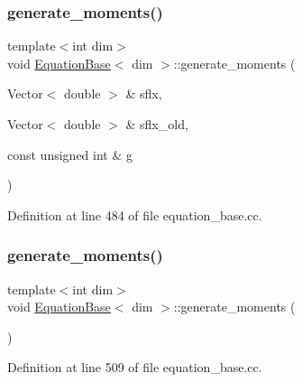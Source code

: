 \subsubsection{\texorpdfstring{generate\+\_\+moments()}{generate\_moments()}\hspace{0.1cm}{\footnotesize\ttfamily [2/3]}}
{\footnotesize\ttfamily template$<$int dim$>$ \\
void \hyperlink{class_equation_base}{Equation\+Base}$<$ dim $>$\+::generate\+\_\+moments (\begin{DoxyParamCaption}\item[{Vector$<$ double $>$ \&}]{sflx,  }\item[{Vector$<$ double $>$ \&}]{sflx\+\_\+old,  }\item[{const unsigned int \&}]{g }\end{DoxyParamCaption})\hspace{0.3cm}{\ttfamily [virtual]}}



Definition at line 484 of file equation\+\_\+base.\+cc.

\mbox{\label{class_equation_base_ab74a0a15d0d2a20022cafad8dd6f46aa}} 
\subsubsection{\texorpdfstring{generate\+\_\+moments()}{generate\_moments()}\hspace{0.1cm}{\footnotesize\ttfamily [3/3]}}
{\footnotesize\ttfamily template$<$int dim$>$ \\
void \hyperlink{class_equation_base}{Equation\+Base}$<$ dim $>$\+::generate\+\_\+moments (\begin{DoxyParamCaption}{ }\end{DoxyParamCaption})\hspace{0.3cm}{\ttfamily [virtual]}}



Definition at line 509 of file equation\+\_\+base.\+cc.

\mbox{\label{class_equation_base_a16045453c59c84bb3f012aef293415aa}} 
